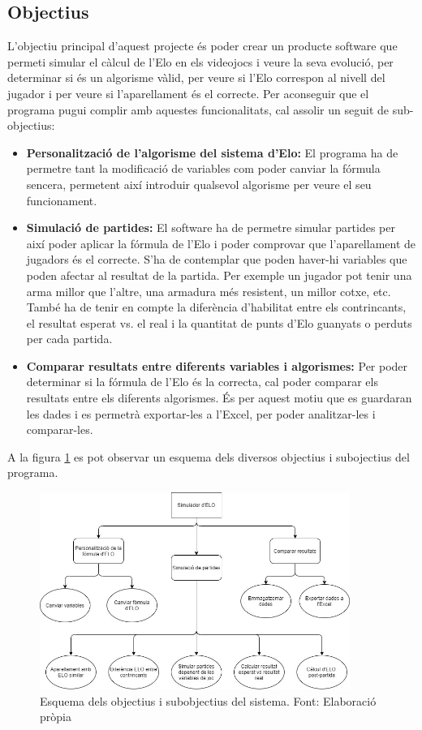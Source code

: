 \documentclass[a4paper]{article}
\begin{document}
\subsection{Objectius}
L'objectiu principal d'aquest projecte és poder crear un producte software que permeti simular el càlcul de l'Elo en els videojocs i veure la seva evolució, per determinar si és un algorisme vàlid, per veure si l'Elo correspon al nivell del jugador i per veure si l'aparellament és el correcte. Per aconseguir que el programa pugui complir amb aquestes funcionalitats, cal assolir un seguit de sub-objectius:
\begin{itemize}
    \item \textbf{Personalització de l'algorisme del sistema d'Elo:} El programa ha de permetre tant la modificació de variables com poder canviar la fórmula sencera, permetent així introduir qualsevol algorisme per veure el seu funcionament.
    
    \item \textbf{Simulació de partides:} El software ha de permetre simular partides per així poder aplicar la fórmula de l'Elo i poder comprovar que l'aparellament de jugadors és el correcte. S'ha de contemplar que poden haver-hi variables que poden afectar al resultat de la partida. Per exemple un jugador pot tenir una arma millor que l'altre, una armadura més resistent, un millor cotxe, etc. També ha de tenir en compte la diferència d'habilitat entre els contrincants, el resultat esperat vs. el real i la quantitat de punts d'Elo guanyats o perduts per cada partida. 
    
    \item \textbf{Comparar resultats entre diferents variables i algorismes:} Per poder determinar si la fórmula de l'Elo és la correcta, cal poder comparar els resultats entre els diferents algorismes. És per aquest motiu que es guardaran les dades i es permetrà exportar-les a l'Excel, per poder analitzar-les i comparar-les.
\end{itemize}

A la figura \ref{fig:EsquemaObjectius} es pot observar un esquema dels diversos objectius i subojectius del programa.

\begin{figure}[H]
    \centering
    \includegraphics[width=0.9\textwidth]{images/FuncionsEsquema.jpg}
    \caption{Esquema dels objectius i subobjectius del sistema. Font: Elaboració pròpia}
    \label{fig:EsquemaObjectius}
\end{figure}
\end{document}
